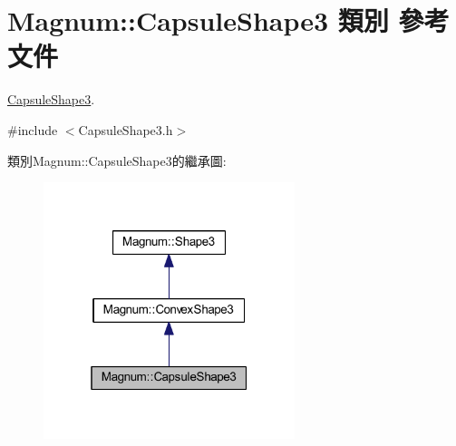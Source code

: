 \hypertarget{class_magnum_1_1_capsule_shape3}{}\section{Magnum\+:\+:Capsule\+Shape3 類別 參考文件}
\label{class_magnum_1_1_capsule_shape3}


\hyperlink{class_magnum_1_1_capsule_shape3}{Capsule\+Shape3}.  




{\ttfamily \#include $<$Capsule\+Shape3.\+h$>$}



類別\+Magnum\+:\+:Capsule\+Shape3的繼承圖\+:\nopagebreak
\begin{figure}[H]
\begin{center}
\leavevmode
\includegraphics[width=208pt]{class_magnum_1_1_capsule_shape3__inherit__graph}
\end{center}
\end{figure}


